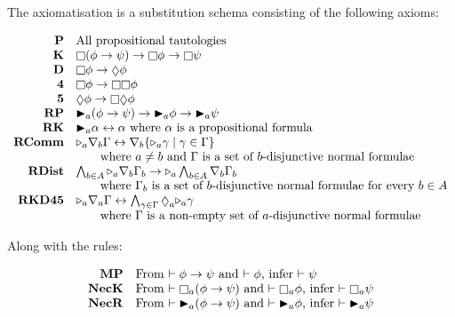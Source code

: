 \begin{definition}[\axiomKDF]
The axiomatisation \axiomKDF{} is a substitution schema consisting of the
following axioms:

$$
\begin{array}{rl}
{\bf P} & \text{All propositional tautologies}\\
{\bf K} & \knows (\phi \implies \psi) \implies \knows \phi \implies \knows
\psi\\
{\bf D} & \knows \phi \implies \suspects \phi\\
{\bf 4} & \knows \phi \implies \knows \knows \phi\\
{\bf 5} & \suspects \phi \implies \knows \suspects \phi\\
{\bf RP} & \allrefs_a (\phi \implies \psi) \implies \allrefs_a \phi \implies
\allrefs_a \psi\\
{\bf RK} & \allrefs_a \alpha \iff \alpha \text{ where $\alpha$ is a
propositional formula}\\
{\bf RComm} & \somerefs_a \covers_b \Gamma \iff \covers_b \{\somerefs_a \gamma
\mid \gamma \in \Gamma\}\\ 
&\qquad\text{where $a \neq b$ and $\Gamma$ is a set of $b$-disjunctive normal formulae}\\
{\bf RDist} & \bigwedge_{b \in A} \somerefs_a \covers_b \Gamma_b \implies
\somerefs_a \bigwedge_{b \in A} \covers_b \Gamma_b\\
&\qquad\text{where $\Gamma_b$ is a set of $b$-disjunctive normal formulae for every $b \in A$}\\
{\bf RKD45} & \somerefs_a \covers_a \Gamma \iff \bigwedge_{\gamma \in \Gamma}
\suspects_a \somerefs_a \gamma\\
&\qquad\text{where $\Gamma$ is a non-empty set of $a$-disjunctive
normal formulae}\\
\end{array}
$$

Along with the rules:

$$
\begin{array}{rl}
{\bf MP} & \text{From $\proves \phi \implies \psi$ and $\proves \phi$, infer
$\proves \psi$}\\
{\bf NecK} & \text{From $\proves \knows_a (\phi \implies \psi)$ and $\proves
\knows_a \phi$, infer $\proves \knows_a \psi$}\\
{\bf NecR} & \text{From $\proves \allrefs_a (\phi \implies \psi)$ and $\proves
\allrefs_a \phi$, infer $\proves \allrefs_a \psi$}
\end{array}
$$
\end{definition}

